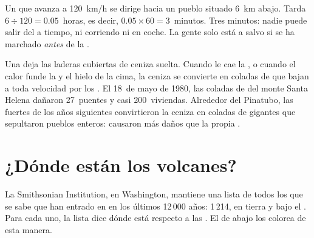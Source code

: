 \begin{example}\label{ex:g7:volcanoes:race}
Un  que avanza a \qty{120}{km/h} se dirige hacia un
pueblo situado \qty{6}{km}  abajo. Tarda $6 \div 120 = 0.05$~horas, es
decir, $0.05 \times 60 = 3$~minutos. Tres minutos: nadie puede salir del
 a tiempo, ni corriendo ni en coche. La gente solo está a salvo si se
ha marchado \emph{antes} de la .
\end{example}

\begin{remark}\label{rem:g7:volcanoes:mudflows}
Una  deja las laderas cubiertas de ceniza suelta. Cuando le cae la
, o cuando el calor funde la  y el hielo de la cima, la ceniza
se convierte en coladas de  que bajan a toda velocidad por los .
El 18~de mayo de 1980, las coladas de  del monte Santa Helena dañaron
27~puentes y casi 200~viviendas. Alrededor del Pinatubo, las fuertes
 de los años siguientes convirtieron la ceniza en coladas de 
gigantes que sepultaron pueblos enteros: causaron más daños que la propia
.
\end{remark}


\section{¿Dónde están los volcanes?}

La Smithsonian Institution, en Washington, mantiene una lista de todos los
 que se sabe que han entrado en  en los últimos 12\,000
años: 1\,214, en tierra y bajo el . Para cada uno, la lista dice dónde
está respecto a las . El  de abajo los colorea de esta manera.

